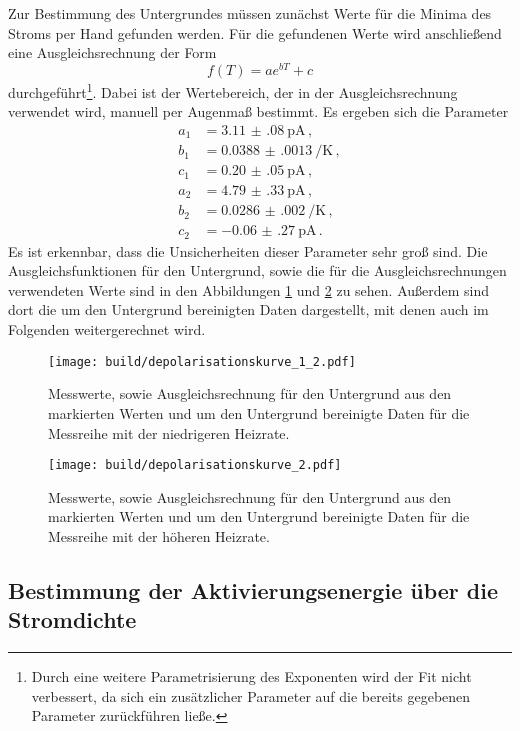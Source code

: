 Zur Bestimmung des Untergrundes müssen zunächst Werte für die Minima des Stroms per Hand gefunden
werden. Für die gefundenen Werte wird anschließend eine Ausgleichsrechnung der
Form
\begin{equation*}
  f(T)=a e^{bT} +c
\end{equation*}
durchgeführt\footnote{Durch eine weitere Parametrisierung des Exponenten wird der Fit nicht verbessert, da sich ein zusätzlicher Parameter auf die bereits gegebenen Parameter zurückführen ließe.}. Dabei ist der Wertebereich, der in der Ausgleichsrechnung verwendet wird,
manuell per Augenmaß bestimmt. Es ergeben sich die Parameter
\begin{align*}
  a_1&=\SI{3.11(08)}{\pico\ampere}  \,,\\
	b_1&=\SI{0.0388(0013)}{\per\kelvin}  \,,\\
  c_1&=\SI{0.20(05)}{\pico\ampere}  \,,\\
  a_2&=\SI{4.79(33)}{\pico\ampere}  \,,\\
	b_2&=\SI{0.0286(0020)}{\per\kelvin}  \,,\\
  c_2&=\SI{-0.06(27)}{\pico\ampere}  \,.
\end{align*}
Es ist erkennbar, dass die Unsicherheiten dieser Parameter sehr groß sind.
Die Ausgleichsfunktionen für den Untergrund, sowie die für die Ausgleichsrechnungen
verwendeten Werte sind in den Abbildungen \ref{fig:depol1} und \ref{fig:depol2} zu sehen.
Außerdem sind dort die um den Untergrund bereinigten Daten dargestellt, mit denen auch
im Folgenden weitergerechnet wird.

\begin{figure}
  \centering
  \texttt{[image: build/depolarisationskurve\_1\_2.pdf]}
  \caption{Messwerte, sowie Ausgleichsrechnung für den Untergrund aus den markierten Werten
  und um den Untergrund bereinigte Daten für die Messreihe mit der niedrigeren Heizrate.}
  \label{fig:depol1}
\end{figure}
\begin{figure}
  \centering
  \texttt{[image: build/depolarisationskurve\_2.pdf]}
  \caption{Messwerte, sowie Ausgleichsrechnung für den Untergrund aus den markierten Werten
  und um den Untergrund bereinigte Daten für die Messreihe mit der höheren Heizrate.
	\cite{wieso haben wir hier dieses komische Maximum?.}}
  \label{fig:depol2}
\end{figure}

\newpage
\subsection{Bestimmung der Aktivierungsenergie über die Stromdichte}

